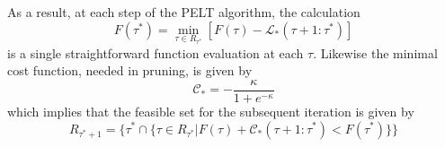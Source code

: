 \documentclass[11pt]{article}
\begin{document}
As a result, at each step of the PELT algorithm, the calculation
\begin{equation}
    F(\tau^*) = \min_{\tau \in R_{\tau^*}} [F(\tau) - \mathcal{L}_*(\tau + 1:\tau^*)]
\end{equation}
is a single straightforward function evaluation at each $\tau$. Likewise the minimal cost function, needed in pruning, is given by
\begin{equation}
    \mathcal{C}_* = - \frac{\kappa}{1 + e^{-\kappa}}
\end{equation}
which implies that the feasible set for the subsequent iteration is given by
\begin{equation}
    R_{\tau^* + 1} = \lbrace \tau^* \cap 
    \lbrace 
    \tau \in R_{\tau^*} \vert F(\tau) + \mathcal{C}_*(\tau + 1:\tau^*) < 
    F(\tau^*)
    \rbrace \rbrace
\end{equation}
\end{document}
